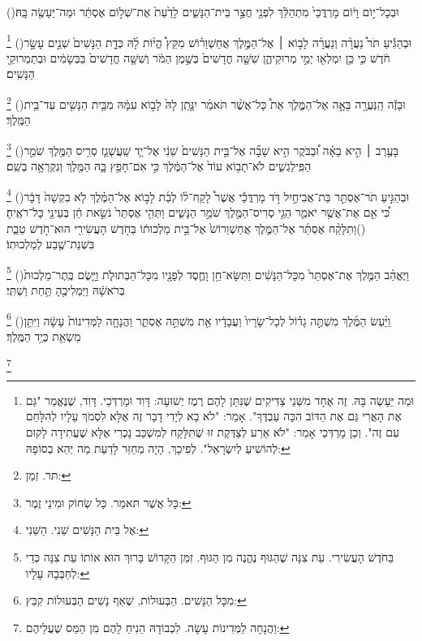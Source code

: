 \documentclass[12pt, openany]{book}
\newcommand{\footnotecomment}[1]{
	\renewcommand\thefootnote{}
	\footnote{#1}}
\newcommand{\commenta}[1]{\footnotecomment{#1}\hspace{0em}}
\newcommand{\vsnum}[1]{(\hebrewnumeral{#1})\space}
\begin{document}
{\vsnum{11}וּבְכָל־י֣וֹם וָי֔וֹם מָרְדֳּכַי֙ מִתְהַלֵּ֔ךְ לִפְנֵ֖י חֲצַ֣ר בֵּית־הַנָּשִׁ֑ים לָדַ֙עַת֙ אֶת־שְׁל֣וֹם אֶסְתֵּ֔ר וּמַה־יֵּעָשֶׂ֖ה בָּֽהּ׃%
\commenta{וּמַה יֵּעָשֶׂה בָּהּ. זֶה אֶחָד מִשְּׁנֵי צַדִּיקִים שֶׁנִּתַּן לָהֶם רֶמֶז יְשׁוּעָה: דָּוִד וּמָרְדְּכַי. דָּוִד, שֶׁנֶּאֱמַר "גַּם אֶת הָאֲרִי גַּם אֶת הַדּוֹב הִכָּה עַבְדֶּךָ". אָמַר: "לֹא בָא לְיָדִי דָבָר זֶה אֶלָּא לִסְמֹךְ עָלָיו לְהִלָּחֵם עִם זֶה". וְכֵן מָרְדְּכַי אָמַר: "לֹא אֵרַע לְצַדֶּקֶת זוּ שֶׁתִּלָּקַח לְמִשְׁכַּב נָכְרִי אֶלָּא שֶׁעֲתִידָה לָקוּם לְהוֹשִׁיעַ לְיִשְׂרָאֵל". לְפִיכָךְ, הָיָה מְחַזֵּר לָדַעַת מַה יְּהֵא בְסוֹפָהּ: }%
\vsnum{12}וּבְהַגִּ֡יעַ תֹּר֩ נַעֲרָ֨ה וְנַעֲרָ֜ה לָב֣וֹא ׀ אֶל־הַמֶּ֣לֶךְ אֲחַשְׁוֵר֗וֹשׁ מִקֵּץ֩ הֱי֨וֹת לָ֜הּ כְּדָ֤ת הַנָּשִׁים֙ שְׁנֵ֣ים עָשָׂ֣ר חֹ֔דֶשׁ כִּ֛י כֵּ֥ן יִמְלְא֖וּ יְמֵ֣י מְרוּקֵיהֶ֑ן שִׁשָּׁ֤ה חֳדָשִׁים֙ בְּשֶׁ֣מֶן הַמֹּ֔ר וְשִׁשָּׁ֤ה חֳדָשִׁים֙ בַּבְּשָׂמִ֔ים וּבְתַמְרוּקֵ֖י הַנָּשִֽׁים׃%
\commenta{תּר. זְמַן:}%
\vsnum{13}וּבָזֶ֕ה הַֽנַּעֲרָ֖ה בָּאָ֣ה אֶל־הַמֶּ֑לֶךְ אֵת֩ כָּל־אֲשֶׁ֨ר תֹּאמַ֜ר יִנָּ֤תֵֽן לָהּ֙ לָב֣וֹא עִמָּ֔הּ מִבֵּ֥ית הַנָּשִׁ֖ים עַד־בֵּ֥ית הַמֶּֽלֶךְ׃%
\commenta{כָּל אֲשֶׁר תּאמַר. כָּל שְׂחוֹק וּמִינֵי זֶמֶר:}%
\vsnum{14}בָּעֶ֣רֶב ׀ הִ֣יא בָאָ֗ה וּ֠בַבֹּקֶר הִ֣יא שָׁבָ֞ה אֶל־בֵּ֤ית הַנָּשִׁים֙ שֵׁנִ֔י אֶל־יַ֧ד שַֽׁעֲשְׁגַ֛ז סְרִ֥יס הַמֶּ֖לֶךְ שֹׁמֵ֣ר הַפִּֽילַגְשִׁ֑ים לֹא־תָב֥וֹא עוֹד֙ אֶל־הַמֶּ֔לֶךְ כִּ֣י אִם־חָפֵ֥ץ בָּ֛הּ הַמֶּ֖לֶךְ וְנִקְרְאָ֥ה בְשֵֽׁם׃%
\commenta{אֶל בֵּית הַנָּשִׁים שֵׁנִי. הַשֵּׁנִי:}%
\vsnum{15}וּבְהַגִּ֣יעַ תֹּר־אֶסְתֵּ֣ר בַּת־אֲבִיחַ֣יִל דֹּ֣ד מָרְדֳּכַ֡י אֲשֶׁר֩ לָקַֽח־ל֨וֹ לְבַ֜ת לָב֣וֹא אֶל־הַמֶּ֗לֶךְ לֹ֤א בִקְשָׁה֙ דָּבָ֔ר כִּ֠י אִ֣ם אֶת־אֲשֶׁ֥ר יֹאמַ֛ר הֵגַ֥י סְרִיס־הַמֶּ֖לֶךְ שֹׁמֵ֣ר הַנָּשִׁ֑ים וַתְּהִ֤י אֶסְתֵּר֙ נֹשֵׂ֣את חֵ֔ן בְּעֵינֵ֖י כָּל־רֹאֶֽיהָ׃
\vsnum{16}וַתִּלָּקַ֨ח אֶסְתֵּ֜ר אֶל־הַמֶּ֤לֶךְ אֲחַשְׁוֵרוֹשׁ֙ אֶל־בֵּ֣ית מַלְכוּת֔וֹ בַּחֹ֥דֶשׁ הָעֲשִׂירִ֖י הוּא־חֹ֣דֶשׁ טֵבֵ֑ת בִּשְׁנַת־שֶׁ֖בַע לְמַלְכוּתֽוֹ׃%
\commenta{בַּחֹדֶשׁ הָעֲשִׂירִי. עֵת צִנָּה שֶׁהַגּוּף נֶהֱנֶה מִן הַגּוּף. זִמֵּן הַקָּדוֹשׁ בָּרוּךְ הוּא אוֹתוֹ עֵת צִנָּה כְּדֵי לְחַבְּבָהּ עָלָיו:}%
\vsnum{17}וַיֶּאֱהַ֨ב הַמֶּ֤לֶךְ אֶת־אֶסְתֵּר֙ מִכָּל־הַנָּשִׁ֔ים וַתִּשָּׂא־חֵ֥ן וָחֶ֛סֶד לְפָנָ֖יו מִכָּל־הַבְּתוּלֹ֑ת וַיָּ֤שֶׂם כֶּֽתֶר־מַלְכוּת֙ בְּרֹאשָׁ֔הּ וַיַּמְלִיכֶ֖הָ תַּ֥חַת וַשְׁתִּֽי׃%
\commenta{מִכָּל הַנָּשִׁים. הַבְּעוּלוֹת, שֶׁאַף נָשִׁים הַבְּעוּלוֹת קִבֵּץ: }%
\vsnum{18}וַיַּ֨עַשׂ הַמֶּ֜לֶךְ מִשְׁתֶּ֣ה גָד֗וֹל לְכָל־שָׂרָיו֙ וַעֲבָדָ֔יו אֵ֖ת מִשְׁתֵּ֣ה אֶסְתֵּ֑ר וַהֲנָחָ֤ה לַמְּדִינוֹת֙ עָשָׂ֔ה וַיִּתֵּ֥ן מַשְׂאֵ֖ת כְּיַ֥ד הַמֶּֽלֶךְ׃%
\commenta{וַהֲנָחָה לַמְּדִינוֹת עָשָׂה. לִכְבוֹדָהּ הֵנִיחַ לָהֶם מִן הַמַּס שֶׁעֲלֵיהֶם:}%
}
\end{document}

